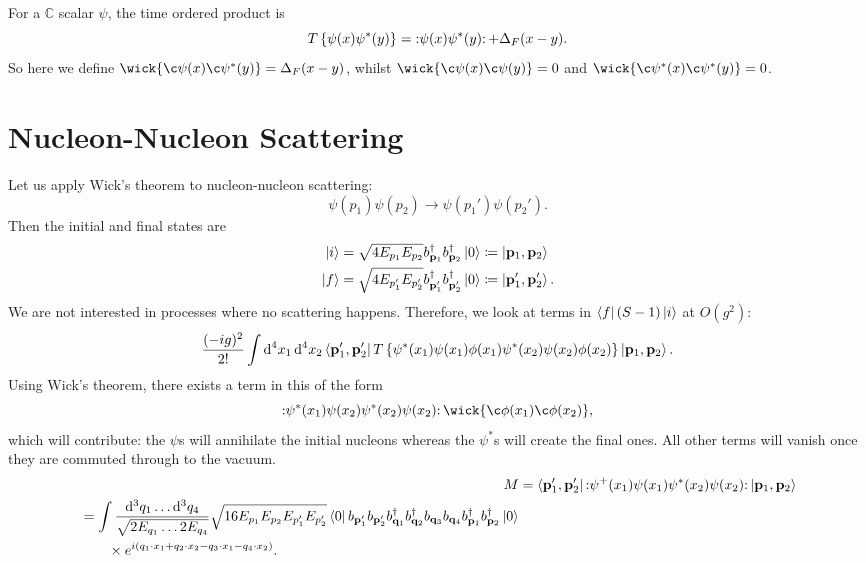 \begin{example}[]
  For a $\mathbb{C}$ scalar $\psi$, the time ordered product is
  \begin{equation}
    T \left\{ \psi(x) \psi^*(y) \right\} = \mathop{:}\nolimits\!\psi(x) \psi^*(y) \!\mathop{:}\nolimits + \Delta_F(x - y).
  \end{equation}
  So here we define $ \wick{\c\psi(x)\c\psi^*(y)} = \Delta_F(x - y)$, whilst $\wick{\c\psi(x)\c\psi(y)} = 0$ and $\wick{\c\psi^*(x)\c\psi^*(y)} = 0$.
\end{example}

\section{Nucleon-Nucleon Scattering}%
\label{sec:nucleon_nucleon_scattering}

Let us apply Wick's theorem to nucleon-nucleon scattering:
\begin{equation}
  \psi(p_1) \psi(p_2) \to \psi(p_1') \psi(p_2').
\end{equation}
Then the initial and final states are
\begin{align}
  \ket{i} &= \sqrt{4 E_{p_1} E_{p_2}} b_{\vb{p}_1}^{\dagger} b_{\vb{p}_2}^{\dagger} \ket{0} \coloneqq \ket{\vb{p}_1, \vb{p}_2} \\
  \ket{f} &= \sqrt{4 E_{p_1'} E_{p_2'}} b^{\dagger}_{\vb{p}_1'} b^{\dagger}_{\vb{p}_2'} \ket{0} \coloneqq \ket{\vb{p}_1', \vb{p}_2'}.
\end{align}
We are not interested in processes where no scattering happens. Therefore, we look at terms in $\bra{f}(S-1)\ket{i}$ at $O(g^2)$:
\begin{equation}
  \frac{(-ig)^2}{2!} \int \dd[4]{x_1} \dd[4]{x_2} \bra{\vb{p}_1', \vb{p}_2'} T \left\{ \psi^*(x_1) \psi(x_1) \phi(x_1) \psi^*(x_2) \psi(x_2) \phi(x_2) \right\} \ket{\vb{p}_1, \vb{p}_2}.
\end{equation}
Using Wick's theorem, there exists a term in this of the form
\begin{equation}
  \normalorder{\psi^* (x_1) \psi(x_2) \psi^*(x_2) \psi(x_2) } \wick{\c\phi(x_1)\c\phi(x_2)},
\end{equation}
which will contribute: the $\psi$s will annihilate the initial nucleons whereas the $\psi^*$s will create the final ones. All other terms will vanish once they are commuted through to the vacuum.
\begin{align}
  M &=\bra{\vb{p}_1', \vb{p}_2'} \mathop{:}\nolimits\!\psi^+(x_1) \psi(x_1) \psi^*(x_2) \psi(x_2) \!\mathop{:}\nolimits \ket{\vb{p}_1, \vb{p}_2} \\
  \begin{split}
    &= \int \frac{\dd[3]{q_1} \dots \dd[3]{q_4}}{\sqrt{2 E_{q_1} \dots 2E_{q_4}}} \sqrt{16 E_{p_1} E_{p_2} E_{p_1'} E_{p_2'}} \bra{0} b_{\vb{p}_1'} b_{\vb{p}_2'} b^{\dagger}_{\vb{q}_1} b^{\dagger}_{\vb{q}_2} b_{\vb{q}_3} b_{\vb{q}_4} b^{\dagger}_{\vb{p}_1} b^{\dagger}_{\vb{p}_2} \ket{0} \\
    & \qquad \times e^{i (q_1 \cdot x_1 + q_2 \cdot x_2 - q_3 \cdot x_1 - q_4 \cdot x_2)}.
  \end{split}
\end{align}
